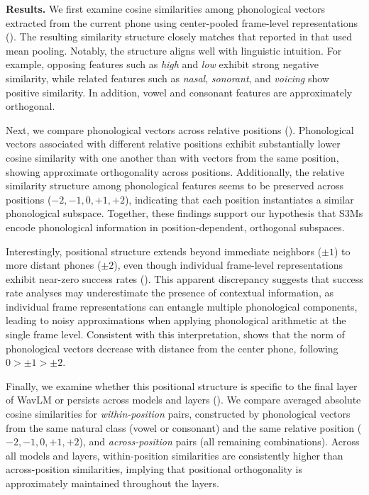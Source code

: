 \documentclass[cameraready]{Interspeech}
\begin{document}



\textbf{Results.}
We first examine cosine similarities among phonological vectors extracted from the current phone using center-pooled frame-level representations ().
The resulting similarity structure closely matches that reported in \cite{choi2026self} that used mean pooling.
Notably, the structure aligns well with linguistic intuition.
For example, opposing features such as \textit{high} and \textit{low} exhibit strong negative similarity, while related features such as \textit{nasal}, \textit{sonorant}, and \textit{voicing} show positive similarity.
In addition, vowel and consonant features are approximately orthogonal.


Next, we compare phonological vectors across relative positions ().
Phonological vectors associated with different relative positions exhibit substantially lower cosine similarity with one another than with vectors from the same position, showing approximate orthogonality across positions.
Additionally, the relative similarity structure among phonological features seems to be preserved across positions ($-2, -1, 0, +1, +2$), indicating that each position instantiates a similar phonological subspace.
Together, these findings support our hypothesis that S3Ms encode phonological information in position-dependent, orthogonal subspaces.


Interestingly, positional structure extends beyond immediate neighbors ($\pm1$) to more distant phones ($\pm2$), even though individual frame-level representations exhibit near-zero success rates ().
This apparent discrepancy suggests that success rate analyses may underestimate the presence of contextual information, as individual frame representations can entangle multiple phonological components, leading to noisy approximations when applying phonological arithmetic at the single frame level.
Consistent with this interpretation,  shows that the norm of phonological vectors decrease with distance from the center phone, following $0 > \pm1 > \pm2$.



Finally, we examine whether this positional structure is specific to the final layer of WavLM or persists across models and layers ().
We compare averaged absolute cosine similarities for \emph{within-position} pairs, constructed by phonological vectors from the same natural class (vowel or consonant) and the same relative position ($-2, -1, 0, +1, +2$), and \emph{across-position} pairs (all remaining combinations).
Across all models and layers, within-position similarities are consistently higher than across-position similarities, implying that positional orthogonality is approximately maintained throughout the layers.
\end{document}
